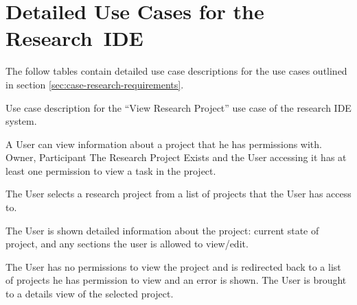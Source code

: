 \documentclass[document.tex]{subfiles}
\begin{document}
\chapter {Detailed Use Cases for the Research~IDE}
\label {ch:detailed-use-cases-2}

The follow tables contain detailed use case descriptions for the use cases outlined in section \ref{sec:case-research-requirements}.


\begin{table}
  \centering
  \caption{Use case description for the ``View Research Project'' use case of the research IDE system.}
  \label{tbl:use-case-view-research-project}

  \begin{usecase}
    A User can view information about a project that he has permissions with.
    Owner, Participant
    The Research Project Exists and the User accessing it has at least one permission to view a task in the project.
    \ucnormal
    \begin{ucenum}
      \item The User selects a research project from a list of projects that the User has access to.
      \item The User is shown detailed information about the project: current state of project, and any sections the user is allowed to view/edit.
    \end{ucenum}
    The User has no permissions to view the project and is redirected back to a list of projects he has permission to view and an error is shown.
    The User is brought to a details view of the selected project.
  \end{usecase}
\end{table}
\end{document}
